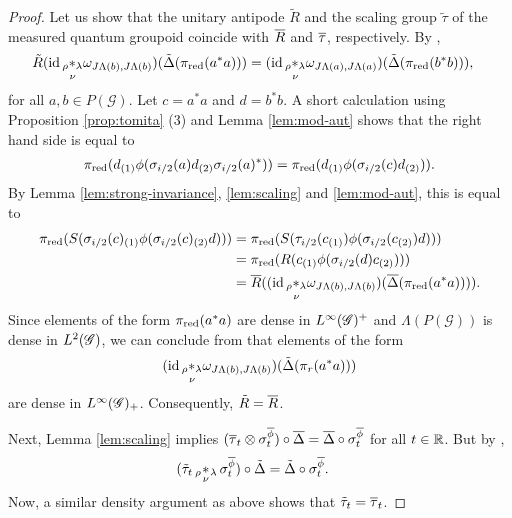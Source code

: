 \begin{proof}
Let us show   that the unitary antipode  $\tilde R$ and the   scaling group   $\tilde\tau$ of the measured quantum groupoid   coincide with $\overline{R}$ and $\overline{\tau}$, respectively.   By \cite[Theorem A.6]{Eno2},
  \begin{align*}
    \tilde R(\operatorname{id} \underset{\nu}{_{\rho} \ast_{\lambda}}
    \omega_{J\Lambda(b),J\Lambda(b)})(\tilde\Delta(\pi_{\operatorname{\mathrm{red}}}(a^{*}a))) &= (\operatorname{id}
    \underset{\nu}{_{\rho} \ast_{\lambda}}
    \omega_{J\Lambda(a),J\Lambda(a)})(\tilde\Delta(\pi_{\operatorname{\mathrm{red}}}(b^{*}b))),
  \end{align*}
  for all $a,b\in P(\mathscr{G})$.  Let $c=a^{*}a$ and $d=b^{*}b$.  A   short calculation using Proposition \ref{prop:tomita}  (3) and Lemma \ref{lem:mod-aut} shows that the right hand  side is equal to
\begin{align*}
  \pi_{\operatorname{\mathrm{red}}} ( d_{(1)}\phi(\sigma_{i/2}(a)d_{(2)}\sigma_{i/2}(a)^{*})) =
  \pi_{\operatorname{\mathrm{red}}}(d_{(1)}\phi(\sigma_{i/2}(c)d_{(2)})).
  \end{align*}
By Lemma \ref{lem:strong-invariance},  \ref{lem:scaling} and   \ref{lem:mod-aut},  this is equal to
  \begin{align*}
   \pi_{\operatorname{\mathrm{red}}}(S(\sigma_{i/2}(c)_{(1)}\phi(\sigma_{i/2}(c)_{(2)}d))) &=
   \pi_{\operatorname{\mathrm{red}}}(S(\tau_{i/2}(c_{(1)})\phi(\sigma_{i/2}(c_{(2)})d))) \\
   &= \pi_{\operatorname{\mathrm{red}}}(R(c_{(1)}\phi(\sigma_{i/2}(d)c_{(2)}))) \\
   &=\overline{R}((\operatorname{id} \underset{\nu}{_{\rho} \ast_{\lambda}}
    \omega_{J\Lambda(b),J\Lambda(b)})(\overline{\Delta}(\pi_{\operatorname{\mathrm{red}}}(a^{*}a)))).
  \end{align*}
  Since elements of the form $\pi_{\operatorname{\mathrm{red}}}(a^{*}a)$ are dense in
  $L^{\infty}(\mathscr{G})^{+}$ and $\Lambda(P(\mathscr{G}))$ is dense in $L^{2}(\mathscr{G})$, we
  can conclude from \cite[Theorem A.7]{Eno2} that elements of the form
  \begin{align*}
  (\operatorname{id} \underset{\nu}{_{\rho}
    \ast_{\lambda}}
  \omega_{J\Lambda(b),J\Lambda(b)})(\tilde\Delta(\pi_{r}(a^{*}a)))  
  \end{align*}
 are  dense in $L^{\infty}(\mathscr{G})_{+}$. Consequently, $\tilde R=\overline{R}$. 

Next,  Lemma \ref{lem:scaling} implies $(\overline{\tau}_{t} \otimes
  \sigma^{\overline{\phi}}_{t}) \circ \overline{\Delta} = \overline{\Delta} \circ
  \sigma^{\overline{\phi}}_{t}$ for all $t\in \mathbb{R}$.  But by \cite[Theorem
  A.5]{Eno2},
  \begin{align*}
    (\tilde \tau_{t} \,{}_{\rho}\!\underset{\nu}{\ast}\,\!\!_{\lambda}\, \sigma^{\overline{\phi}}_{t}) \circ \tilde \Delta
    &=\tilde \Delta \circ \sigma^{\overline{\phi}}_{t}.
  \end{align*}
Now,  a similar density  argument as above shows that
  $\tilde \tau_{t}=\overline{\tau}_{t}$.
\end{proof}

